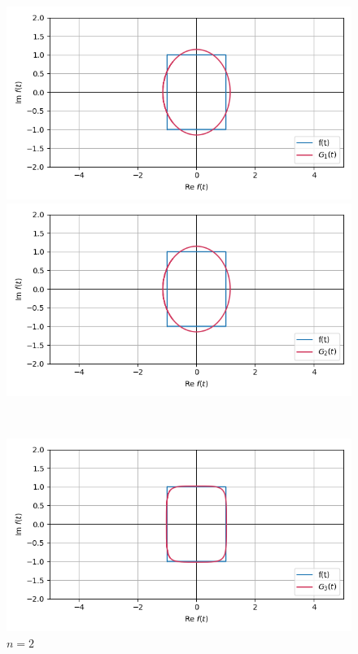 \documentclass[a4paper]{article}
\begin{document}
\begin{figure}[H]
    \begin{minipage}{0.5\textwidth}
        \centering \includegraphics[width=\textwidth]{parametric_func/1.png}
        \caption{$n = 1$}
    \end{minipage}\hfill
    \begin{minipage}{0.5\textwidth}
        \centering \includegraphics[width=\textwidth]{parametric_func/2.png}
        \caption{$n = 2$}
    \end{minipage}\\[2em]
    \begin{minipage}{0.5\textwidth}
        \centering \includegraphics[width=\textwidth]{parametric_func/3.png}

\end{minipage}
\end{figure}
\end{document}
